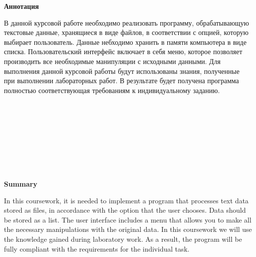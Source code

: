 \begin{center}
	\Large{
		\textbf{Аннотация}
	}
\end{center}

В данной курсовой работе необходимо реализовать программу, обрабатывающую текстовые данные, хранящиеся в виде файлов, в соответствии с опцией, которую выбирает пользователь. Данные небходимо хранить в памяти компьютера в виде списка. Пользовательский интерфейс включает в себя меню, которое позволяет производить все необходимые манипуляции с исходными данными. Для выполнения данной курсовой работы будут использованы знания, полученные при выполнении лабораторных работ. В результате будет получена программа полностью соответствующая требованиям к индивидуальному заданию.
\\
\\
\\
\\
\\
\\
\\
\\
\\
\begin{center}
	\Large{
		\textbf{Summary}
	}
\end{center}

In this coursework, it is needed to implement a program that processes text data stored as files, in accordance with the option that the user chooses. Data should be stored as a list. The user interface includes a menu that allows you to make all the necessary manipulations with the original data. In this coursework we will use the knowledge gained during laboratory work. As a result, the program will be fully compliant with the requirements for the individual task.